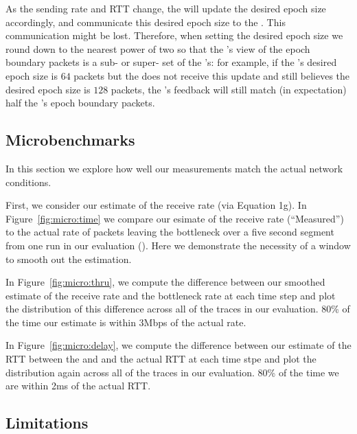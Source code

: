 As the sending rate and RTT change, the \inbox will update the desired epoch size accordingly, and communicate this desired epoch size to the \outbox.
This communication might be lost. 
Therefore, when setting the desired epoch size we round down to the nearest power of two so that the \outbox's view of the epoch boundary packets is a sub- or super- set of the \inbox's:
for example, 
if the \inbox's desired epoch size is $64$ packets
but the \outbox does not receive this update and still believes the desired epoch size is $128$ packets, 
the \outbox's feedback will still match (in expectation) half the \inbox's epoch boundary packets.

\subsection{Microbenchmarks}
\label{s:measure:microbench}
    
    
    
    In this section we explore how well our measurements match the actual network conditions. 

    First, we consider our estimate of the receive rate (via Equation 1g). In Figure~\ref{fig:micro:time}
    we compare our esimate of the receive rate (``Measured'') to the actual rate of packets 
    leaving the bottleneck over a five second segment from one run in our evaluation ().
    Here we demonstrate the necessity of a window to smooth out the estimation.

    In Figure~\ref{fig:micro:thru}, we compute the difference between our smoothed estimate of the receive rate 
    and the bottleneck rate at each time step and plot the distribution of this difference across
    all of the traces in our evaluation. 80\% of the time our estimate is within 3Mbps of the 
    actual rate.

    In Figure~\ref{fig:micro:delay}, we compute the difference between our estimate of the RTT between
    the \inbox and \outbox and the actual RTT at each time stpe and plot the distribution again
    across all of the traces in our evaluation. 80\% of the time we are within 2ms of the actual RTT.
    
\subsection{Limitations}
